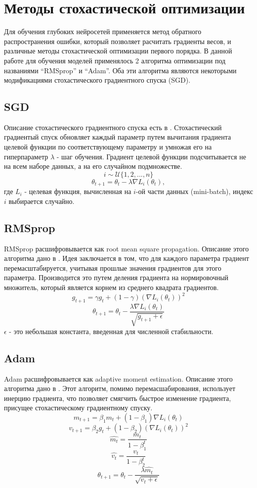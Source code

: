 \section{Методы стохастической оптимизации}
	Для обучения глубоких нейросетей применяется метод обратного распространения ошибки, который позволяет расчитать градиенты весов, и различные методы стохастической оптимизации первого порядка. В данной работе для обучения моделей применялось 2 алгоритма оптимизации под названиями ``RMSprop'' и ``Adam''. Оба эти алгоритма являются некоторыми модификациями стохастического градиентного спуска (SGD).
	\subsection{SGD}
		Описание стохастического градиентного спуска есть в \cite{sgd}. Стохастический градиентый спуск обновляет каждый параметр путем вычитания градиента целевой функции по соответствующему параметру и умножая его на гиперпараметр $\lambda$ - шаг обучения. Градиент целевой функции подсчитывается не на всем наборе данных, а на его случайном подмножестве.
		$$ i \sim \mathcal{U}\{1, 2, ..., n\} $$
		$$ \theta_{t+1} = \theta_t - \lambda \nabla L_i(\theta_t), $$
		где $L_i$ - целевая функция, вычисленная на $i$-ой части данных (mini-batch), индекс $i$ выбирается случайно.
	\subsection{RMSprop}
		RMSprop расшифровывается как root mean square propagation. Описание этого алгоритма дано в \cite{rmsprop}. Идея заключается в том, что для каждого параметра градиент перемасштабируется, учитывая прошлые значения градиентов для этого параметра. Производится это путем деления градиента на нормировочный множитель, который является корнем из среднего квадрата градиентов.
		$$ g_{t+1} = \gamma g_t + (1 - \gamma) (\nabla L_i(\theta_t))^2$$
		$$ \theta_{t+1} = \theta_t - \frac{\lambda \nabla L_i(\theta_t)}{\sqrt{g_{t+1} + \epsilon}} $$
		$\epsilon$ - это небольшая константа, введенная для численной стабильности.
	\subsection{Adam}
		Adam расшифровывается как adaptive moment estimation. Описание этого алгоритма дано в \cite{adam}. Этот алгоритм, помимо перемасшабирования, использует инерцию градиента, что позволяет смягчить быстрое изменение градиента, присущее стохастическому градиентному спуску.
		$$ m_{t+1} = \beta_1 m_t + (1 - \beta_1) \nabla L_i(\theta_t) $$
		$$ v_{t+1} = \beta_2 g_t + (1 - \beta_2) (\nabla L_i(\theta_t))^2 $$
		$$ \hat{m_t} = \frac{m_t}{1 - \beta_1^t} $$
		$$ \hat{v_t} = \frac{v_t}{1 - \beta_2^t}$$
		$$ \theta_{t+1} = \theta_t - \frac{\lambda \hat{m_t}}{\sqrt{v_t + \epsilon}} $$
	